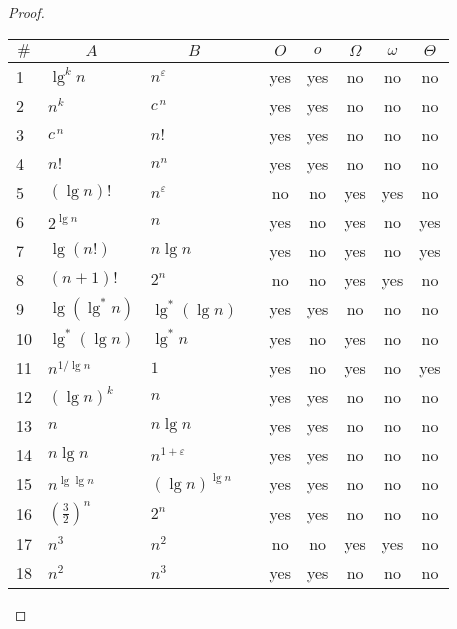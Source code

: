 \documentclass[12pt]{article}
\theoremstyle{definition}
\begin{document}
\begin{proof}
\setlength{\tabcolsep}{6pt}
\renewcommand{\arraystretch}{1.15}
\begin{tabular}{llllccccc}
\toprule
\multicolumn{1}{c}{$\#$} & \multicolumn{1}{c}{$A$} & \multicolumn{1}{c}{$B$} & & $O$ & $o$ & $\Omega$ & $\omega$ & $\Theta$ \\
\midrule
1  & $\lg^k n$           & $n^{\varepsilon}$        & & yes & yes & no  & no  & no  \\
2  & $n^{k}$             & $c^{\,n}$                & & yes & yes & no  & no  & no  \\
3  & $c^{\,n}$           & $n!$                     & & yes & yes & no  & no  & no  \\
4  & $n!$                & $n^{n}$                  & & yes & yes & no  & no  & no  \\
5  & $(\lg n)!$          & $n^{\varepsilon}$        & & no  & no  & yes & yes & no  \\
6  & $2^{\lg n}$         & $n$                      & & yes & no  & yes & no  & yes \\
7  & $\lg(n!)$           & $n\lg n$                 & & yes & no  & yes & no  & yes \\
8  & $(n+1)!$            & $2^n$                    & & no  & no  & yes & yes & no  \\
9  & $\lg(\lg^* n)$      & $\lg^*(\lg n)$           & & yes & yes & no  & no  & no  \\
10 & $\lg^*(\lg n)$      & $\lg^* n$                & & yes & no  & yes & no  & no  \\
11 & $n^{1/\lg n}$       & $1$                      & & yes & no  & yes & no  & yes \\
12 & $(\lg n)^k$         & $n$                      & & yes & yes & no  & no  & no  \\
13 & $n$                 & $n\lg n$                 & & yes & yes & no  & no  & no  \\
14 & $n\lg n$            & $n^{1+\varepsilon}$      & & yes & yes & no  & no  & no  \\
15 & $n^{\lg\lg n}$      & $(\lg n)^{\lg n}$        & & yes & yes & no  & no  & no  \\
16 & $(\tfrac{3}{2})^{n}$& $2^{n}$                  & & yes & yes & no  & no  & no  \\
17 & $n^{3}$             & $n^{2}$                  & & no  & no  & yes & yes & no  \\
18 & $n^{2}$             & $n^{3}$                  & & yes & yes & no  & no  & no  \\

\end{tabular}
\end{proof}
\end{document}

